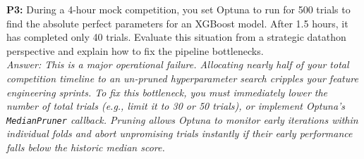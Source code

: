 \documentclass{article}
\begin{document}
\newline
\textbf{P3:} During a 4-hour mock competition, you set Optuna to run for 500 trials to find the absolute perfect parameters for an XGBoost model. After 1.5 hours, it has completed only 40 trials. Evaluate this situation from a strategic datathon perspective and explain how to fix the pipeline bottlenecks.
\\
\textit{Answer: This is a major operational failure. Allocating nearly half of your total competition timeline to an un-pruned hyperparameter search cripples your feature engineering sprints. To fix this bottleneck, you must immediately lower the number of total trials (e.g., limit it to 30 or 50 trials), or implement Optuna's \texttt{MedianPruner} callback. Pruning allows Optuna to monitor early iterations within individual folds and abort unpromising trials instantly if their early performance falls below the historic median score.}
\end{document}

